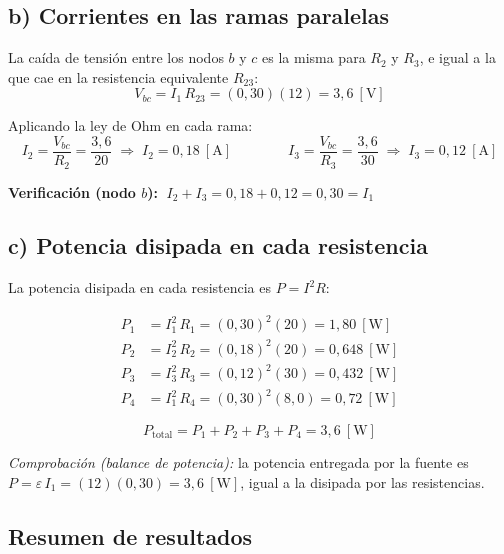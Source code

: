 \documentclass[12pt,letterpaper]{article}
\begin{document}
\subsection*{b) Corrientes en las ramas paralelas}

La ca\'ida de tensi\'on entre los nodos $b$ y $c$ es la misma para $R_2$ y $R_3$, e igual
a la que cae en la resistencia equivalente $R_{23}$:
\[
    V_{bc} = I_1\,R_{23} = (0{,}30)(12) = 3{,}6\ [\text{V}]
\]

Aplicando la ley de Ohm en cada rama:
\[
    I_2 = \frac{V_{bc}}{R_2} = \frac{3{,}6}{20}
        \;\Rightarrow\; \boxed{I_2 = 0{,}18\ [\text{A}]}
    \qquad\qquad
    I_3 = \frac{V_{bc}}{R_3} = \frac{3{,}6}{30}
        \;\Rightarrow\; \boxed{I_3 = 0{,}12\ [\text{A}]}
\]

\noindent\textbf{Verificaci\'on (nodo $b$):}
$\;I_2 + I_3 = 0{,}18 + 0{,}12 = 0{,}30 = I_1$ \checkmark

\subsection*{c) Potencia disipada en cada resistencia}

La potencia disipada en cada resistencia es $P = I^2 R$:

\begin{align*}
    P_1 &= I_1^2\,R_1 = (0{,}30)^2 (20) = 1{,}80\ [\text{W}] \\
    P_2 &= I_2^2\,R_2 = (0{,}18)^2 (20) = 0{,}648\ [\text{W}] \\
    P_3 &= I_3^2\,R_3 = (0{,}12)^2 (30) = 0{,}432\ [\text{W}] \\
    P_4 &= I_1^2\,R_4 = (0{,}30)^2 (8{,}0) = 0{,}72\ [\text{W}]
\end{align*}

\[
    \boxed{P_{\text{total}} = P_1 + P_2 + P_3 + P_4 = 3{,}6\ [\text{W}]}
\]

\noindent\small\textit{Comprobaci\'on (balance de potencia):} la potencia entregada por la
fuente es $P = \varepsilon\,I_1 = (12)(0{,}30) = 3{,}6\ [\text{W}]$, igual a la disipada
por las resistencias. \checkmark
\normalsize

\subsection*{Resumen de resultados}
\end{document}
